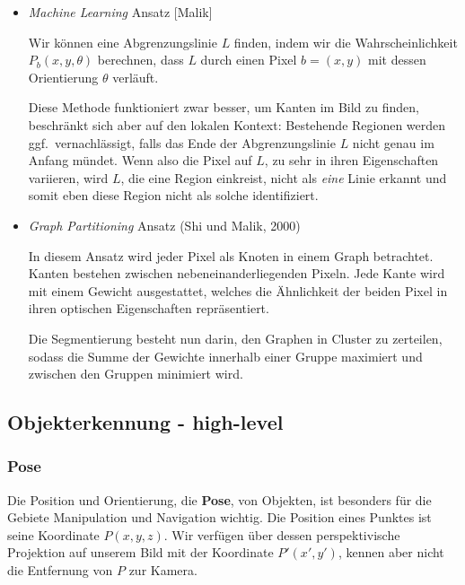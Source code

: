 \begin{itemize}
\item \textit{Machine Learning} Ansatz [Malik]

Wir können eine Abgrenzungslinie $L$ finden, indem wir die Wahrscheinlichkeit $P_b(x,y,\theta)$ berechnen, dass $L$ durch einen Pixel $b=(x,y)$ mit dessen Orientierung $\theta$ verläuft.

Diese Methode funktioniert zwar besser, um Kanten im Bild zu finden, beschränkt sich aber auf den lokalen Kontext: Bestehende Regionen werden ggf.\ vernachlässigt, falls das Ende der Abgrenzungslinie $L$ nicht genau im Anfang mündet. Wenn also die Pixel auf $L$, zu sehr in ihren Eigenschaften variieren, wird $L$, die eine Region einkreist, nicht als \textit{eine} Linie erkannt und somit eben diese Region nicht als solche identifiziert.

\item \textit{Graph Partitioning} Ansatz (Shi und Malik, 2000)

In diesem Ansatz wird jeder Pixel als Knoten in einem Graph betrachtet. Kanten bestehen zwischen nebeneinanderliegenden Pixeln. Jede Kante wird mit einem Gewicht ausgestattet, welches die Ähnlichkeit der beiden Pixel in ihren optischen Eigenschaften repräsentiert.

Die Segmentierung besteht nun darin, den Graphen in Cluster zu zerteilen, sodass die Summe der Gewichte innerhalb einer Gruppe maximiert und zwischen den Gruppen minimiert wird.


\end{itemize}

\subsection{Objekterkennung - \glqq high-level\grqq}

\subsubsection{Pose}

Die Position und Orientierung, die \textbf{Pose}, von Objekten, ist besonders für die Gebiete Manipulation und Navigation wichtig. Die Position eines Punktes ist seine Koordinate $P(x,y,z)$. Wir verfügen über dessen perspektivische Projektion auf unserem Bild mit der Koordinate $P'(x',y')$,
kennen aber nicht die Entfernung von $P$ zur Kamera.


